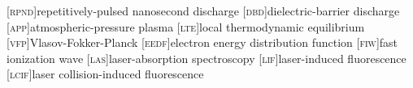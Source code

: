 [\textsc{rpnd}]{repetitively-pulsed nanosecond discharge}
[\textsc{dbd}]{dielectric-barrier discharge}
[\textsc{app}]{atmospheric-pressure plasma}
[\textsc{lte}]{local thermodynamic equilibrium}
[\textsc{vfp}]{Vlasov-Fokker-Planck}
[\textsc{eedf}]{electron energy distribution function}
[\textsc{fiw}]{fast ionization wave}
[\textsc{las}]{laser-absorption spectroscopy}
[\textsc{lif}]{laser-induced fluorescence}
[\textsc{lcif}]{laser collision-induced fluorescence}
